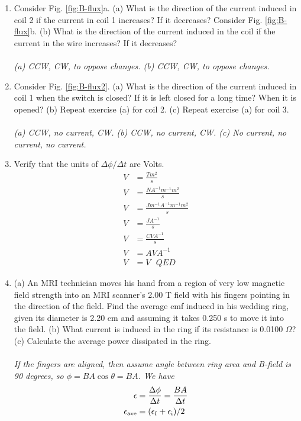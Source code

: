\documentclass[12pt,twocolumn]{article}
\begin{document}
\noindent
\begin{enumerate}
\item Consider Fig. \ref{fig:B-flux}a.  (a) What is the direction of the current induced in coil 2 if the current in coil 1 increases? If it decreases?  Consider Fig. \ref{fig:B-flux}b.  (b) What is the direction of the current induced in the coil if the current in the wire increases?  If it decreases? \\ \\ \textit{(a) CCW, CW, to oppose changes. (b) CCW, CW, to oppose changes.}
\item Consider Fig. \ref{fig:B-flux2}.  (a) What is the direction of the current induced in coil 1 when the switch is closed?  If it is left closed for a long time?  When it is opened?  (b) Repeat exercise (a) for coil 2.  (c) Repeat exercise (a) for coil 3. \\ \\ \textit{(a) CCW, no current, CW. (b) CCW, no current, CW. (c) No current, no current, no current.}
\item Verify that the units of $\Delta\phi/\Delta t$ are Volts.
\begin{align}
V &= \frac{T m^2}{s} \\
V &= \frac{N A^{-1} m^{-1} m^2}{s} \\
V &= \frac{J m^{-1} A^{-1} m^{-1} m^2}{s} \\
V &= \frac{J A^{-1}}{s} \\
V &= \frac{C V A^{-1}}{s} \\
V &= A V A^{-1} \\
V &= V ~~~ QED
\end{align}
\item (a) An MRI technician moves his hand from a region of very low magnetic field strength into an MRI scanner's 2.00 T field with his fingers pointing in the direction of the field. Find the average emf induced in his wedding ring, given its diameter is 2.20 cm and assuming it takes 0.250 s to move it into the field. (b) What current is induced in the ring if its resistance is 0.0100 $\Omega$?  (c) Calculate the average power dissipated in the ring. \\ \\
\textit{If the fingers are aligned, then assume angle between ring area and B-field is 90 degrees, so $\phi = BA\cos\theta = BA$.  We have}
\begin{align}
\epsilon &= \frac{\Delta \phi}{\Delta t} = \frac{BA}{\Delta t} \\
\epsilon_{\rm ave} &= (\epsilon_{\rm f} + \epsilon_{\rm i})/2 \\

\end{align}
\end{enumerate}
\end{document}
